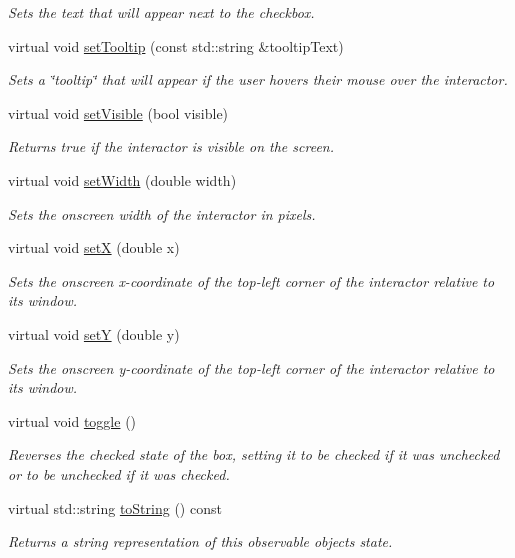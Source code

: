\begin{DoxyCompactItemize}
\begin{DoxyCompactList}\small\item\em Sets the text that will appear next to the checkbox. \end{DoxyCompactList}\item 
virtual void \mbox{\hyperlink{classGInteractor_a039e0e49beaecc275efce02d416acea8}{set\+Tooltip}} (const std\+::string \&tooltip\+Text)
\begin{DoxyCompactList}\small\item\em Sets a \char`\"{}tooltip\char`\"{} that will appear if the user hovers their mouse over the interactor. \end{DoxyCompactList}\item 
virtual void \mbox{\hyperlink{classGInteractor_a18e44e30b31525a243960ca3928125aa}{set\+Visible}} (bool visible)
\begin{DoxyCompactList}\small\item\em Returns true if the interactor is visible on the screen. \end{DoxyCompactList}\item 
virtual void \mbox{\hyperlink{classGInteractor_aa3f3fba4cb131baa8696ba01e3bceca1}{set\+Width}} (double width)
\begin{DoxyCompactList}\small\item\em Sets the onscreen width of the interactor in pixels. \end{DoxyCompactList}\item 
virtual void \mbox{\hyperlink{classGInteractor_a9c18fcc579333bf9653d13ad2b372e39}{setX}} (double x)
\begin{DoxyCompactList}\small\item\em Sets the onscreen x-\/coordinate of the top-\/left corner of the interactor relative to its window. \end{DoxyCompactList}\item 
virtual void \mbox{\hyperlink{classGInteractor_a7d57e2a5c35d27feb58fd498a3cf82b9}{setY}} (double y)
\begin{DoxyCompactList}\small\item\em Sets the onscreen y-\/coordinate of the top-\/left corner of the interactor relative to its window. \end{DoxyCompactList}\item 
virtual void \mbox{\hyperlink{classGCheckBox_ad277193b2dca0bab1e0ad24d45407dc3}{toggle}} ()
\begin{DoxyCompactList}\small\item\em Reverses the checked state of the box, setting it to be checked if it was unchecked or to be unchecked if it was checked. \end{DoxyCompactList}\item 
virtual std\+::string \mbox{\hyperlink{classGObservable_a1fe5121d6528fdea3f243321b3fa3a49}{to\+String}} () const
\begin{DoxyCompactList}\small\item\em Returns a string representation of this observable object\textquotesingle{}s state. \end{DoxyCompactList}\end{DoxyCompactItemize}

